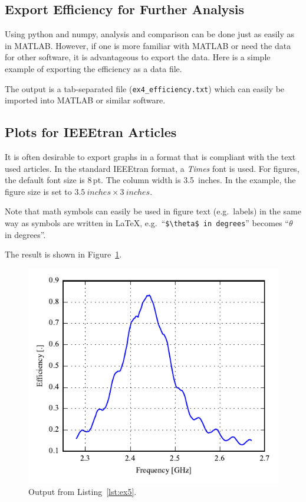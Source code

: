 \subsection{Export Efficiency for Further Analysis}
Using python and numpy, analysis and comparison can be done just as easily as in MATLAB. However, if one is more familiar with MATLAB or need the data for other software, it is advantageous to export the data. Here is a simple example of exporting the efficiency as a data file.



The output is a tab-separated file (\texttt{ex4\_efficiency.txt}) which can easily be imported into MATLAB or similar software.

\subsection{Plots for IEEEtran Articles}
It is often desirable to export graphs in a format that is compliant with the text used articles. In the standard IEEEtran format, a \emph{Times} font is used. For figures, the default font size is 8\,pt. The column width is \SI{3.5}{inches}. In the example, the figure size is set to $\SI{3.5}{inches}\times \SI{3}{inches}$.

Note that math symbols can easily be used in figure text (e.g.\ labels) in the same way as symbols are written in \LaTeX, e.g.\ ``\verb|$\theta$ in degrees|'' becomes ``$\theta$ in degrees''.

The result is shown in Figure~\ref{fig:pp_example5}.



\begin{figure}[htbp]
    \centering
    \includegraphics{sec/post_processing/examples/ex5_efficiency.pdf}
    \caption{Output from Listing~\ref{lst:ex5}.}
    \label{fig:pp_example5}
\end{figure}


